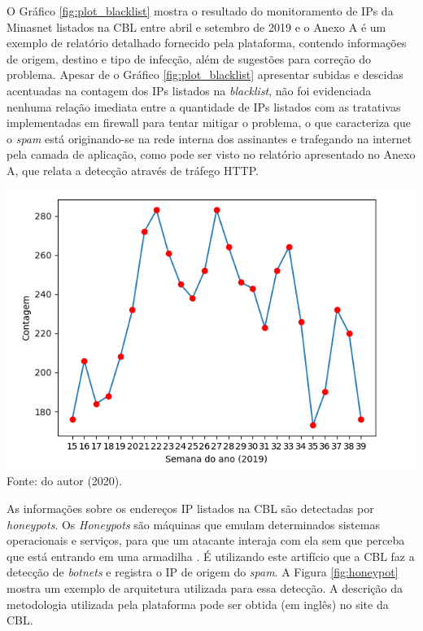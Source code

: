     O Gráfico \ref{fig:plot_blacklist} mostra o resultado do monitoramento de IPs da Minasnet listados na CBL entre abril e setembro de 2019 e o Anexo A é um exemplo de relatório detalhado fornecido pela plataforma, contendo informações de origem, destino e tipo de infecção, além de sugestões para correção do problema. Apesar de o Gráfico \ref{fig:plot_blacklist} apresentar subidas e descidas acentuadas na contagem dos IPs listados na \textit{blacklist}, não foi evidenciada nenhuma relação imediata entre a quantidade de IPs listados com as tratativas implementadas em firewall para tentar mitigar o problema, o que caracteriza que o \textit{spam} está originando-se na rede interna dos assinantes e trafegando na internet pela camada de aplicação, como pode ser visto no relatório apresentado no Anexo A, que relata a detecção através de tráfego HTTP.
    
    \begin{grafico}[!htb]
        \centering
        \caption{Contagem de IPs do AS listados na CBL entre abril e setembro de 2019.} 
        \label{fig:plot_blacklist} 
        \includegraphics[scale=0.5]{img/plot_blacklist.png} \\
        {\small Fonte: do autor (2020).} 
    \end{grafico}
    
    As informações sobre os endereços IP listados na CBL são detectadas por \textit{honeypots}. Os \textit{Honeypots} são máquinas que emulam determinados sistemas operacionais e serviços, para que um atacante interaja com ela sem que perceba que está entrando em uma armadilha \cite{spampots2007}. É utilizando este artifício que a CBL faz a detecção de \textit{botnets} e registra o IP de origem do \textit{spam}. A Figura \ref{fig:honeypot} mostra um exemplo de arquitetura utilizada para essa detecção. A descrição da metodologia utilizada pela plataforma pode ser obtida (em inglês) no site da CBL. 
    
